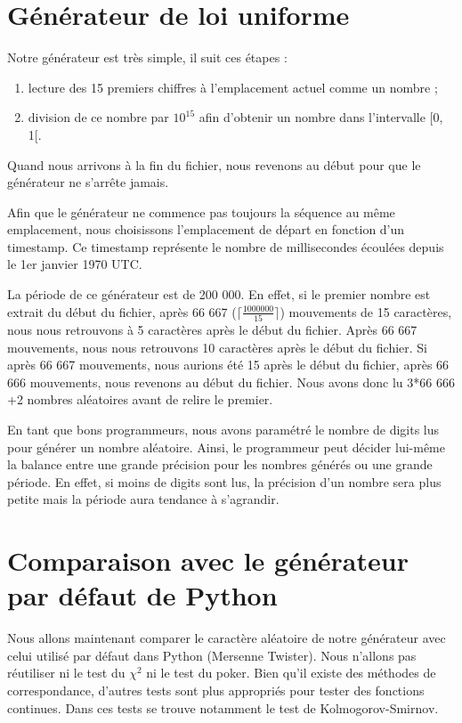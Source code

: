\documentclass[10pt,a4paper]{article}
\begin{document}
	\newpage
	\section{Générateur de loi uniforme}
	Notre générateur est très simple, il suit ces étapes :
	\begin{enumerate}
		\item lecture des 15 premiers chiffres à l'emplacement actuel comme un nombre ;
		\item division de ce nombre par $10^{15}$ afin d'obtenir un nombre dans l'intervalle [0, 1[.
	\end{enumerate}
	Quand nous arrivons à la fin du fichier, nous revenons au début pour que le générateur ne s'arrête jamais.
	
	Afin que le générateur ne commence pas toujours la séquence au même emplacement, nous choisissons l'emplacement de départ en fonction d'un timestamp.
	Ce timestamp représente le nombre de millisecondes écoulées depuis le 1er janvier 1970 UTC.
	
	La période de ce générateur est de 200 000.
	En effet, si le premier nombre est extrait du début du fichier, après 66 667 ($\lceil\frac{1 000 000}{15}\rceil$) mouvements de 15 caractères, nous nous retrouvons à 5 caractères après le début du fichier.
	Après 66 667 mouvements, nous nous retrouvons 10 caractères après le début du fichier.
	Si après 66 667 mouvements, nous aurions été 15 après le début du fichier, après 66 666 mouvements, nous revenons au début du fichier.
	Nous avons donc lu 3*66 666 +2 nombres aléatoires avant de relire le premier.
	
	En tant que bons programmeurs, nous avons paramétré le nombre de digits lus pour générer un nombre aléatoire.
	Ainsi, le programmeur peut décider lui-même la balance entre une grande précision pour les nombres générés ou une grande période.
	En effet, si moins de digits sont lus, la précision d'un nombre sera plus petite mais la période aura tendance à s'agrandir.
	
	\newpage
	\section{Comparaison avec le générateur par défaut de Python}
	Nous allons maintenant comparer le caractère aléatoire de notre générateur avec celui utilisé par défaut dans Python (Mersenne Twister).
	Nous n'allons pas réutiliser ni le test du $\chi^2$ ni le test du poker.
	Bien qu'il existe des méthodes de correspondance, d'autres tests sont plus appropriés pour tester des fonctions continues.
	Dans ces tests se trouve notamment le test de Kolmogorov-Smirnov.
	
\end{document}
